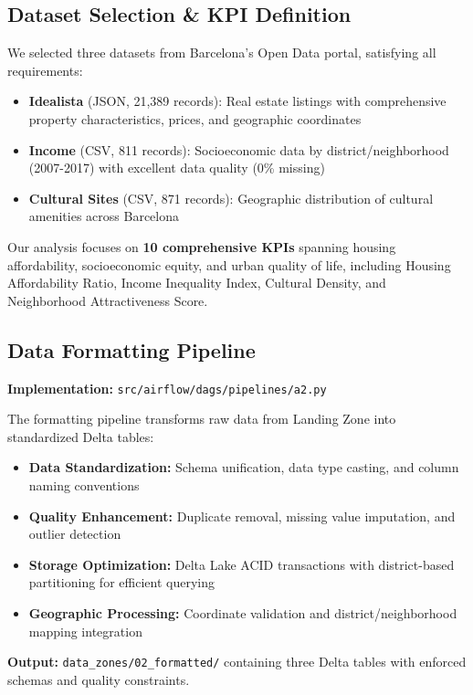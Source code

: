\subsection{Dataset Selection \& KPI Definition}

We selected three datasets from Barcelona's Open Data portal, satisfying all requirements:

\begin{itemize}[nosep]
\item \textbf{Idealista} (JSON, 21,389 records): Real estate listings with comprehensive property characteristics, prices, and geographic coordinates
\item \textbf{Income} (CSV, 811 records): Socioeconomic data by district/neighborhood (2007-2017) with excellent data quality (0\% missing)
\item \textbf{Cultural Sites} (CSV, 871 records): Geographic distribution of cultural amenities across Barcelona
\end{itemize}

Our analysis focuses on \textbf{10 comprehensive KPIs} spanning housing affordability, socioeconomic equity, and urban quality of life, including Housing Affordability Ratio, Income Inequality Index, Cultural Density, and Neighborhood Attractiveness Score.

\subsection{Data Formatting Pipeline}

\textbf{Implementation:} \texttt{src/airflow/dags/pipelines/a2.py}

The formatting pipeline transforms raw data from Landing Zone into standardized Delta tables:

\begin{itemize}[nosep]
\item \textbf{Data Standardization:} Schema unification, data type casting, and column naming conventions
\item \textbf{Quality Enhancement:} Duplicate removal, missing value imputation, and outlier detection
\item \textbf{Storage Optimization:} Delta Lake ACID transactions with district-based partitioning for efficient querying
\item \textbf{Geographic Processing:} Coordinate validation and district/neighborhood mapping integration
\end{itemize}

\textbf{Output:} \texttt{data\_zones/02\_formatted/} containing three Delta tables with enforced schemas and quality constraints.

